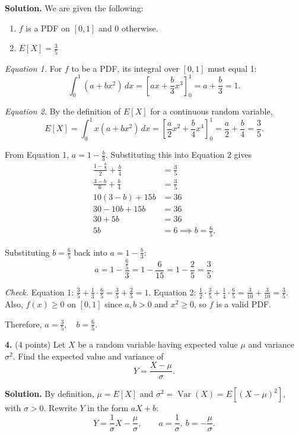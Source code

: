 \documentclass[letterpaper]{article}
\begin{document}
\textbf{Solution.} We are given the following: 
\begin{enumerate}
    \item $f$ is a PDF on $[0,1]$ and $0$ otherwise.
    \item $E[X] = \frac{3}{5}$
\end{enumerate}

\textit{Equation 1.} For $f$ to be a PDF, its integral over $[0,1]$ must equal 1:
\[
    \int_0^1 (a + bx^2)\,dx = \left[ax + \frac{b}{3}x^3\right]_0^1 = a + \frac{b}{3} = 1.
\]

\textit{Equation 2.} By the definition of $E[X]$ for a continuous random variable,
\[
    E[X] = \int_0^1 x(a + bx^2)\,dx = \left[\frac{a}{2}x^2 + \frac{b}{4}x^4\right]_0^1 = \frac{a}{2} + \frac{b}{4} = \frac{3}{5}.
\]

From Equation 1, $a = 1 - \frac{b}{3}$. Substituting this into Equation 2 gives
\begin{align*}
    \frac{1 - \frac{b}{3}}{2} + \frac{b}{4} &= \frac{3}{5} \\[4pt]
    \frac{3 - b}{6} + \frac{b}{4} &= \frac{3}{5} \\[4pt]
    10(3 - b) + 15b &= 36 \\[4pt]
    30 - 10b + 15b &= 36 \\[4pt]
    30 + 5b &= 36 \\[4pt]
    5b &= 6 \implies \boxed{b = \frac{6}{5}}.
\end{align*}


Substituting $b=\frac{6}{5}$ back into $a = 1 - \frac{b}{3}$:
\[
    a = 1 - \frac{\frac{6}{5}}{3} = 1 - \frac{6}{15} = 1 - \frac{2}{5} = \boxed{\frac{3}{5}}.
\]

\textit{Check.} Equation 1: $\frac{3}{5} + \frac{1}{3}\cdot\frac{6}{5} = \frac{3}{5} + \frac{2}{5} = 1$. Equation 2: $\frac{1}{2}\cdot\frac{3}{5} + \frac{1}{4}\cdot\frac{6}{5} = \frac{3}{10} + \frac{3}{10} = \frac{3}{5}$. Also, $f(x) \ge 0$ on $[0,1]$ since $a, b > 0$ and $x^2 \ge 0$, so $f$ is a valid PDF.

Therefore, $\boxed{a = \frac{3}{5}, \quad b = \frac{6}{5}}$.


\bigskip
\textbf{4.} (4 points) Let $X$ be a random variable having expected value $\mu$ and variance $\sigma^2$. Find the expected value and variance of
\[
    Y = \frac{X - \mu}{\sigma}.
\]

\textbf{Solution.} By definition, $\mu = E[X]$ and $\sigma^2 = \operatorname{Var}(X) = E[(X-\mu)^2]$, with $\sigma > 0$. Rewrite $Y$ in the form $aX + b$:
\[
    Y = \frac{1}{\sigma}X - \frac{\mu}{\sigma}, \qquad a = \frac{1}{\sigma},\ b = -\frac{\mu}{\sigma}.
\]
\end{document}
